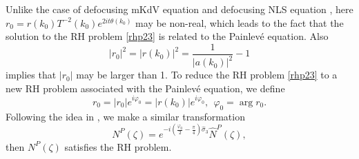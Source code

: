 \documentclass[11pt]{article}
\numberwithin{equation}{section}
\begin{document}
 Unlike  the  case of defocusing mKdV equation  and  defocusing   NLS  equation \cite{zhou-1993}, here    $r_0=r(k_0)T^{-2}(k_0)e^{2it\theta(k_0)}$  may be   non-real,  which leads to the fact that   the solution to the RH problem \ref{rhp23} is related to the Painlev\'{e} \uppercase\expandafter{} equation.  Also
$$|r_0|^2=|r(k_0)|^2=\frac{1}{|a(k_0)|^2}-1 $$
 implies that  $|r_0|$ may be larger than 1.
To reduce  the RH problem \ref{rhp23}  to a new RH problem    associated with  the Painlev\'{e} \uppercase\expandafter{} equation, we  define
\begin{equation}
r_0 = |r_0 | e^{i\varphi_0}= |r(k_0) | e^{i\varphi_0}, \ \ \varphi_0=\arg r_0. \label{phi0}
\end{equation}
Following the idea in \cite{Monvel}, we make a similar transformation
\begin{equation}\label{eq58}
    {N}^{P}(\zeta) =e^{-i \left( \frac{ \varphi_0}{2} -\frac{\pi}{4}\right)\widehat\sigma_3} \widehat {N}^{P}( \zeta),
\end{equation}
then ${N}^{P}(\zeta)$ satisfies the RH problem.
\end{document}
